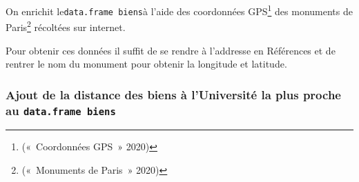\documentclass[french,]{article}
\newenvironment{Shaded}{\begin{snugshade}}{\end{snugshade}}
\newcommand{\CommentTok}[1]{\textcolor[rgb]{0.56,0.35,0.01}{\textit{#1}}}
\newcommand{\ControlFlowTok}[1]{\textcolor[rgb]{0.13,0.29,0.53}{\textbf{#1}}}
\newcommand{\DataTypeTok}[1]{\textcolor[rgb]{0.13,0.29,0.53}{#1}}
\newcommand{\DecValTok}[1]{\textcolor[rgb]{0.00,0.00,0.81}{#1}}
\newcommand{\KeywordTok}[1]{\textcolor[rgb]{0.13,0.29,0.53}{\textbf{#1}}}
\newcommand{\NormalTok}[1]{#1}
\newcommand{\OperatorTok}[1]{\textcolor[rgb]{0.81,0.36,0.00}{\textbf{#1}}}
\newcommand{\StringTok}[1]{\textcolor[rgb]{0.31,0.60,0.02}{#1}}
\begin{document}
On enrichit le\texttt{data.frame\ biens}à l'aide des coordonnées
GPS\footnote{(«~Coordonnées GPS~» 2020)} des monuments de
Paris\footnote{(«~Monuments de Paris~» 2020)} récoltées sur internet.

Pour obtenir ces données il suffit de se rendre à l'addresse en
Références et de rentrer le nom du monument pour obtenir la longitude et
latitude.

\begin{Shaded}
\end{Shaded}

\hypertarget{ajout-de-la-distance-des-biens-uxe0-luniversituxe9-la-plus-proche-au-data.frame-biens}{%
\subsubsection{\texorpdfstring{Ajout de la distance des biens à
l'Université la plus proche au
\texttt{data.frame\ biens}}{Ajout de la distance des biens à l'Université la plus proche au data.frame biens}}\label{ajout-de-la-distance-des-biens-uxe0-luniversituxe9-la-plus-proche-au-data.frame-biens}}
\end{document}
